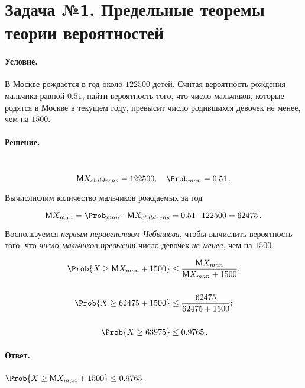 
\section{Задача №1. Предельные теоремы теории вероятностей}

\paragraph{Условие.} В Москве рождается в год около $122500$ детей. Считая вероятность рождения мальчика равной $0.51$, найти вероятность того, что число мальчиков, которые родятся в Москве в текущем году, превысит число родившихся девочек не менее, чем на $1500$.

\paragraph{Решение.}\hfill\\
\[
    \Expect X_{childrens} = 122500, \quad \Prob_{man} = 0.51\,.
\]

\noindent
Вычислислим количество мальчиков рождаемых за год

\[
    \Expect X_{man} = \Prob_{man} \cdot\, \Expect X_{childrens} = 0.51 \cdot 122500 = 62475\,.
\]

\noindent
Воспользуемся \emph{первым неравенством Чебышева}, чтобы вычислить вероятность того, что \emph{число мальчиков превысит} число девочек \emph{не менее}, чем на $1500$.


\begin{align*}
    \Prob \{ X \geq \Expect X_{man} + 1500 \} &\leq \frac{\Expect X_{man}}{\Expect X_{man} + 1500};
    \\\\
    \Prob \{ X \geq 62475 + 1500 \} &\leq \frac{62475}{62475 + 1500};
    \\\\
    \Prob \{ X \geq 63975 \} &\leq 0.9765\,.
\end{align*}

\paragraph{Ответ.} $\Prob \{ X \geq \Expect X_{man} + 1500 \} \leq 0.9765$\,.